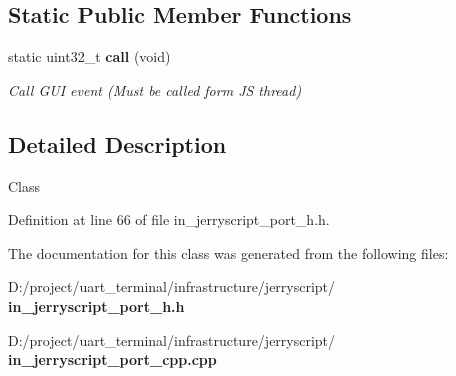 \subsection*{Static Public Member Functions}
\begin{DoxyCompactItemize}
\item 
static uint32\+\_\+t \textbf{ call} (void)
\begin{DoxyCompactList}\small\item\em Call G\+UI event (Must be called form JS thread) \end{DoxyCompactList}\end{DoxyCompactItemize}


\subsection{Detailed Description}
Class 

Definition at line 66 of file in\+\_\+jerryscript\+\_\+port\+\_\+h.\+h.



The documentation for this class was generated from the following files\+:\begin{DoxyCompactItemize}
\item 
D\+:/project/uart\+\_\+terminal/infrastructure/jerryscript/\textbf{ in\+\_\+jerryscript\+\_\+port\+\_\+h.\+h}\item 
D\+:/project/uart\+\_\+terminal/infrastructure/jerryscript/\textbf{ in\+\_\+jerryscript\+\_\+port\+\_\+cpp.\+cpp}\end{DoxyCompactItemize}
